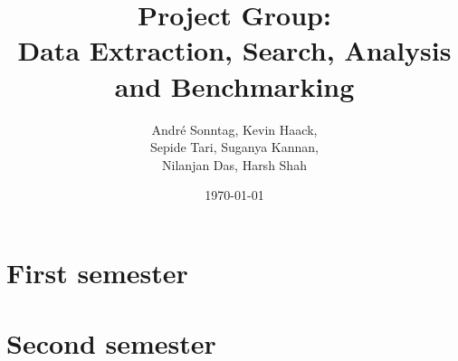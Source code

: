 \documentclass{beamer}
\title{Project Group:\\Data Extraction, Search, Analysis and Benchmarking}
\author{André Sonntag, Kevin Haack,\\Sepide Tari, Suganya Kannan,\\Nilanjan Das, Harsh Shah}
\institute{Paderborn University}
\date{\today}
\begin{document}
\begin{frame}
  \titlepage
\end{frame}



\section{First semester}











\section{Second semester}















\end{document}
